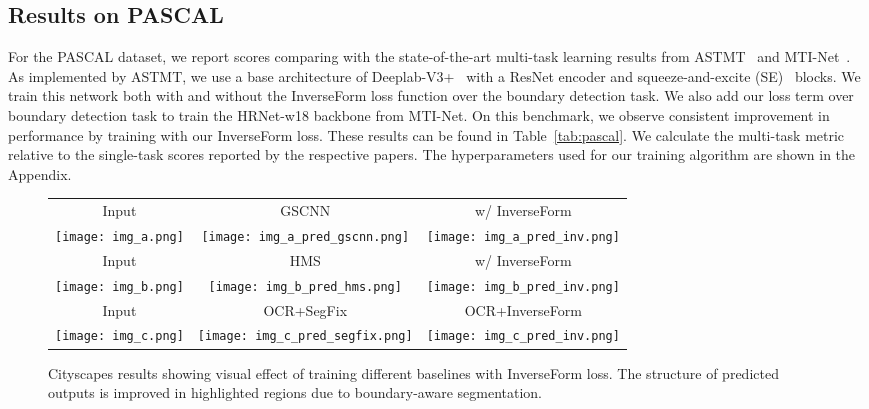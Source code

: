 \documentclass[final]{cvpr}
\begin{document}
\subsection{Results on PASCAL}
For the PASCAL dataset, we report scores comparing with the state-of-the-art multi-task learning results from ASTMT~\cite{maninis2019attentive} and MTI-Net~\cite{vandenhende2020mti}. As implemented by ASTMT, we use a base architecture of Deeplab-V3+~\cite{deeplab} with a ResNet encoder and squeeze-and-excite (SE)~\cite{squeezeexcite} blocks. We train this network both with and without the InverseForm loss function over the boundary detection task. We also add our loss term over boundary detection task to train the HRNet-w18 backbone from MTI-Net. On this benchmark, we observe consistent improvement in performance by training with our InverseForm loss. These results can be found in Table~\ref{tab:pascal}. We calculate 
the multi-task metric relative to the single-task scores reported by the respective papers. The hyperparameters used for our training algorithm are shown in the Appendix.

\begin{figure}[t]
\center
\begin{tabularx}{\textwidth}{c c c}
Input & GSCNN & w/ InverseForm \\
\hspace{-4mm}
\texttt{[image: img\_a.png]} \hspace{-4mm} &
\texttt{[image: img\_a\_pred\_gscnn.png]} \hspace{-4mm} &
\texttt{[image: img\_a\_pred\_inv.png]} \\

Input & HMS & w/ InverseForm \\

\hspace{-4mm}
\texttt{[image: img\_b.png]} \hspace{-4mm} &
\texttt{[image: img\_b\_pred\_hms.png]} \hspace{-4mm} &
\texttt{[image: img\_b\_pred\_inv.png]} \\

Input & OCR+SegFix &  OCR+InverseForm \\

\hspace{-4mm}
\texttt{[image: img\_c.png]} \hspace{-4mm} &
\texttt{[image: img\_c\_pred\_segfix.png]} \hspace{-4mm} &
\texttt{[image: img\_c\_pred\_inv.png]} \\

\end{tabularx}
\caption{Cityscapes results showing visual effect of training different baselines with InverseForm loss. The structure of predicted outputs is improved in highlighted regions due to boundary-aware segmentation.} \label{fig:cityscapes results}
\end{figure}
\end{document}
